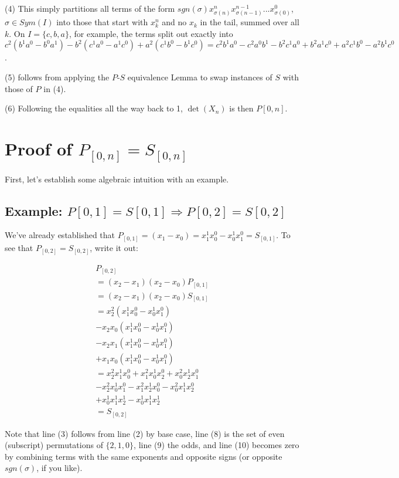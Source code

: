 \documentclass[11pt, oneside]{article} 	%
\begin{document}
(4) This simply partitions all terms of the form $sgn(\sigma) x_{\sigma(n)}^{n} x_{\sigma(n-1)}^{n-1} ... x_{\sigma(0)}^{0}$, $\sigma \in Sym(I)$ into those that start with $x_k^n$ and no $x_k$ in the tail, summed over all $k$.   On  $I = \{c,b,a\}$, for example, the terms split out exactly into $c^2(b^1a^0 - b^0a^1) - b^2(c^1a^0-a^1c^0) + a^2(c^1b^0-b^1c^0) = c^2b^1a^0 - c^2a^0b^1 - b^2c^1a^0 + b^2a^1c^0 + a^2c^1b^0 - a^2b^1c^0$.

(5) follows from applying the $P$-$S$ equivalence Lemma to swap instances of $S$ with those of $P$ in (4).

(6) Following the equalities all the way back to 1, $\det(X_n)$ is then $P[0,n]$.

\section{Proof of $P_{[0,n]} = S_{[0,n]}$}

First, let's establish some algebraic intuition with an example.

\subsection{Example: $P{[0,1]} = S{[0,1]} \Rightarrow P{[0,2]} = S{[0,2]}$}
We've already established that $P_{[0,1]} = (x_1 - x_0) =  x_1^1x_0^0 - x_0^1x_1^0 = S_{[0,1]}$.  To see that $P_{[0,2]} = S_{[0,2]}$, write it out:

\begin{align}
P_{[0,2]}  \\
= (x_2-x_1)(x_2-x_0)P_{[0,1]} \\
= (x_2-x_1)(x_2-x_0)S_{[0,1]} \\
= x_2^2(x_1^1x_0^0 - x_0^1x_1^0) \\
- x_2x_0(x_1^1x_0^0 - x_0^1x_1^0) \\
- x_2x_1 (x_1^1x_0^0 - x_0^1x_1^0) \\
+ x_1x_0(x_1^1x_0^0 - x_0^1x_1^0)  \\
= x_2^2x_1^1x_0^0  + x_1^2x_0^1x_2^0 + x_0^2x_2^1x_1^0   \\
 - x_2^2x_0^1x_1^0 - x_1^2x_2^1x_0^0 - x_0^2x_1^1x_2^0 \\
+ x_0^1x_1^1x_2^1 - x_0^1x_1^1x_2^1 \\
= S_{[0,2]}
\end{align}

Note that line (3) follows from line (2) by base case, line (8) is the set of even (subscript) permutations of $\{2,1,0\}$, line (9) the odds, and line (10) becomes zero by combining terms with the same exponents and opposite signs (or opposite $sgn(\sigma)$, if you like).
\end{document}
